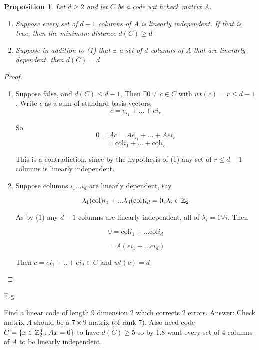 \documentclass[]{article}
\newtheorem{prop}[thm]{Proposition}
\theoremstyle{definition}
\theoremstyle{remark}
\numberwithin{equation}{section}
\begin{document}
		\begin{prop}
		Let $d \geq 2$ and let $C$ be a code wit hcheck matrix $A$.
		\begin{enumerate}
			\item\par Suppose every set of $d-1$ columns of $A$ is linearly independent. If that is true, then the minimum distance $d(C) \geq d$
			\item\par Suppose in addition to (1) that $\exists$ a set of $d$ columns of $A$ that are linerarly dependent. then $d(C) = d$
		\end{enumerate}
		\end{prop}

		\begin{proof}
		\begin{enumerate}
			\item\par Suppose false, and $d(C) \leq d-1$. Then $\exists 0 \neq c \in C$ with $wt(c) = r \leq d-1$. Write $c$ as a sum of standard basis vectors:
			\[
				c = e_{i_1} + ... + e{i_r}
			\]

			So \[
				0 = Ac = Ae_{i_1} + ... + Ae{i_r}
			\]
			\[
				= \text{col}i_1 + ... + \text{col}i_r
			\]

			This is a contradiction, since by the hypothesis of (1) any set of $r \leq d-1$ columns is linearly independent.

			\item\par
			Suppose columns $i_1 ... i_d$ are linearly dependent, say

			\[
				\lambda_1 (\text{col})i_1 + ... \lambda_d(\text{col})i_d = 0, \lambda_i \in \mathbb{Z}_2
			\]

			As by (1) any $d-1$ columns are linearly independent, all of $\lambda_i = 1 \forall i$. Then

			\[
				0 = \text{col}i_1 + ... \text{col}i_d
			\]

			\[
				= A(e{i_1} + ... e{i_d})
			\]

			Then $c = e{i_1} + .. + e{i_d} \in C$ and $wt(c) = d$
		\end{enumerate}
		\end{proof}

		E.g

			Find a linear code of length 9 dimension 2 which corrects 2 errors.
			Answer:
			Check matrix $A$ should be a $7 \times 9$ matrix (of rank 7).
			Also need code $C = \{x \in \mathbb{Z}_2^9: Ax = 0\}$ to have $d(C)\geq 5$ so by 1.8 want every set of 4 columns of $A$ to be linearly independent.
\end{document}
